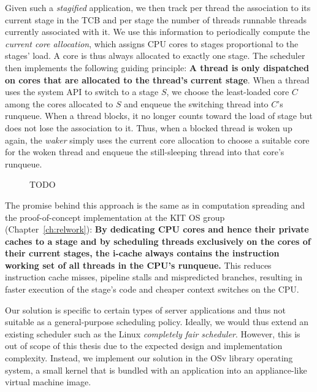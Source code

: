 \documentclass[12pt,a4paper]{book}
\begin{document}
Given such a \emph{stagified} application, we then track per thread the association to its current stage in the TCB and per stage the number of threads runnable threads currently associated with it.
We use this information to periodically compute the \emph{current core allocation}, which assigns CPU cores to stages proportional to the stages' load.
A core is thus always allocated to exactly one stage. %
The scheduler then implements the following guiding principle: \textbf{A thread is only dispatched on cores that are allocated to the thread's current stage}.
When a thread uses the system API to switch to a stage $S$, we choose the least-loaded core $C$ among the cores allocated to $S$ and enqueue the switching thread into $C$'s runqueue.
When a thread blocks, it no longer counts toward the load of stage but does not lose the association to it.
Thus, when a blocked thread is woken up again, the \emph{waker} simply uses the current core allocation to choose a suitable core for the woken thread and enqueue the still-sleeping thread into that core's runqueue.

\begin{figure}[h]
    \caption{TODO}
\end{figure}

The promise behind this approach is the same as in computation spreading and the proof-of-concept implementation at the KIT OS group (Chapter~\ref{ch:relwork}):
\textbf{By dedicating CPU cores and hence their private caches to a stage and by scheduling threads exclusively on the cores of their current stages, the i-cache always contains the instruction working set of all threads in the CPU's runqueue.}
This reduces instruction cache misses, pipeline stalls and mispredicted branches, resulting in faster execution of the stage's code and cheaper context switches on the CPU.

Our solution is specific to certain types of server applications and thus not suitable as a general-purpose scheduling policy.
Ideally, we would thus extend an existing scheduler such as the Linux \emph{completely fair scheduler}.
However, this is out of scope of this thesis due to the expected design and implementation complexity.
Instead, we implement our solution in the OSv library operating system, a small kernel that is bundled with an application into an appliance-like virtual machine image.
\end{document}
